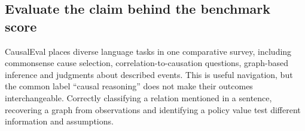 \hypertarget{evaluate-the-claim-behind-the-benchmark-score}{%
\subsection{Evaluate the claim behind the benchmark
score}\label{evaluate-the-claim-behind-the-benchmark-score}}

\label{exec13:census-evaluation}

CausalEval places diverse language tasks in one comparative survey,
including commonsense cause selection, correlation-to-causation
questions, graph-based inference and judgments about described events.
This is useful navigation, but the common label ``causal reasoning''
does not make their outcomes interchangeable. Correctly classifying a
relation mentioned in a sentence, recovering a graph from observations
and identifying a policy value test different information and
assumptions. \cite{exec13_census_causaleval}

